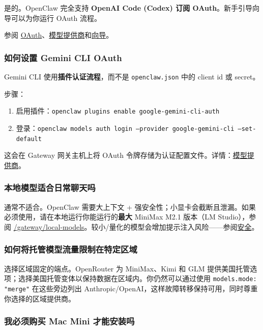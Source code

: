 是的。OpenClaw 完全支持 \textbf{OpenAI Code (Codex) 订阅 OAuth}。新手引导向导可以为你运行 OAuth 流程。

参阅 \href{/concepts/oauth}{OAuth}、\href{/concepts/model-providers}{模型提供商}和\href{/start/wizard}{向导}。

\subsubsection{如何设置 Gemini CLI OAuth}


Gemini CLI 使用\textbf{插件认证流程}，而不是 \texttt{openclaw.json} 中的 client id 或 secret。

步骤：

\begin{enumerate}
  \item 启用插件：\texttt{openclaw plugins enable google-gemini-cli-auth}
  \item 登录：\texttt{openclaw models auth login --provider google-gemini-cli --set-default}
\end{enumerate}


这会在 Gateway 网关主机上将 OAuth 令牌存储为认证配置文件。详情：\href{/concepts/model-providers}{模型提供商}。

\subsubsection{本地模型适合日常聊天吗}


通常不适合。OpenClaw 需要大上下文 + 强安全性；小显卡会截断且泄漏。如果必须使用，请在本地运行你能运行的\textbf{最大} MiniMax M2.1 版本（LM Studio），参阅 \href{/gateway/local-models}{/gateway/local-models}。较小/量化的模型会增加提示注入风险——参阅\href{/gateway/security}{安全}。

\subsubsection{如何将托管模型流量限制在特定区域}


选择区域固定的端点。OpenRouter 为 MiniMax、Kimi 和 GLM 提供美国托管选项；选择美国托管变体以保持数据在区域内。你仍然可以通过使用 \texttt{models.mode: "merge"} 在这些旁边列出 Anthropic/OpenAI，这样故障转移保持可用，同时尊重你选择的区域提供商。

\subsubsection{我必须购买 Mac Mini 才能安装吗}


